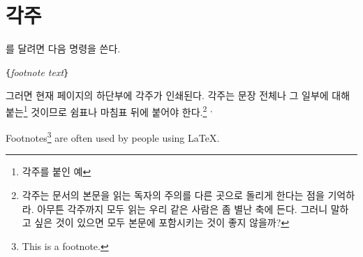 \section{각주}
를 달려면 다음 명령을 쓴다.
\begin{lscommand}
\verb|{|\emph{footnote text}\verb|}|
\end{lscommand}

\noindent 그러면 현재 페이지의 하단부에 각주가 인쇄된다.
각주는 문장 전체나 그 일부에 대해 붙는\footnote{각주를 붙인 예} 것이므로 쉼표나 마침표 뒤에 붙어야 한다.\footnote{%
  각주는 문서의 본문을 읽는 독자의 주의를 다른 곳으로 돌리게 한다는 점을 기억하라.
  아무튼 각주까지 모두 읽는 우리 같은 사람은 좀 별난 축에 든다. 그러니 말하고 싶은 것이 있으면 모두 본문에 포함시키는 것이 좋지 않을까?\footnotemark}%
%
\textsuperscript{,}

\begin{example}
Footnotes\footnote{This is
  a footnote.} are often used
by people using \LaTeX.
\end{example}


